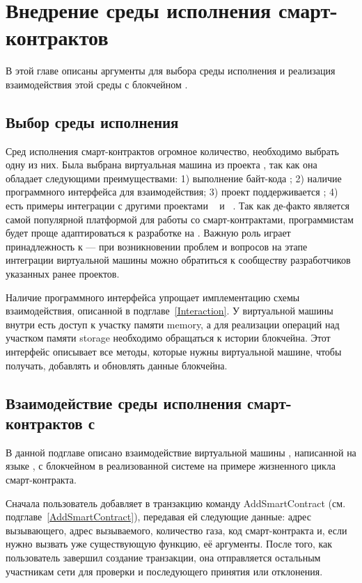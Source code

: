 \section{Внедрение среды исполнения смарт-кон\-трак\-тов}
В этой главе описаны аргументы для выбора среды исполнения и реализация взаимодействия этой среды с блокчейном .

\subsection{Выбор среды исполнения}
Сред исполнения смарт-контрактов огромное количество, необходимо выбрать одну из них.
Была выбрана виртуальная машина из проекта , так как она обладает следующими преимуществами: 1) выполнение байт-кода ; 2) наличие программного интерфейса для взаимодействия; 3) проект поддерживается ; 4) есть примеры интеграции с другими проектами ~\cite{HLFabricEVM} и ~\cite{HLSeth}.
Так как  де-факто является самой популярной платформой для работы со смарт-контрактами, программистам будет проще адаптироваться к разработке на .
Важную роль играет принадлежность к  --- при возникновении проблем и вопросов на этапе интеграции виртуальной машины можно обратиться к сообществу разработчиков указанных ранее проектов.

Наличие программного интерфейса упрощает имплементацию схемы взаимодействия, описанной в подглаве~\ref{Interaction}.
У виртуальной машины внутри есть доступ к участку памяти memory, а для реализации операций над участком памяти storage необходимо обращаться к истории блокчейна.
Этот интерфейс описывает все методы, которые нужны виртуальной машине, чтобы получать, добавлять и обновлять данные блокчейна.


\subsection{Взаимодействие среды исполнения смарт-кон\-трак\-тов с }
В данной подглаве описано взаимодействие виртуальной машины , написанной на языке , с блокчейном  в реализованной системе на примере жизненного цикла смарт-контракта.

Сначала пользователь добавляет в транзакцию команду Add\-Smart\-Con\-tract (см. подглаве~\ref{AddSmartContract}), передавая ей следующие данные: адрес вызывающего, адрес вызываемого, количество газа, код смарт-кон\-тракта и, если нужно вызвать уже существующую функцию, её аргументы.
После того, как пользователь завершил создание транзакции, она отправляется остальным участникам сети для проверки и последующего принятия или отклонения.

